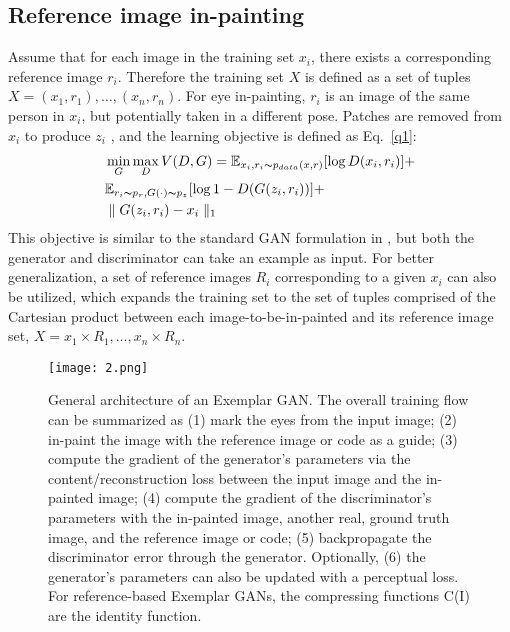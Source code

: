 \documentclass[10pt,twocolumn,letterpaper]{article}
\begin{document}
\subsection{Reference image in-painting}

Assume that for each image in the training set $x_i$, there exists a corresponding reference image $r_i$. Therefore the training set $X$ is defined as a set of tuples $X = {(x_1,r_1 ),\ldots,(x_n,r_n)}$. For eye in-painting, $r_i$ is an image of the same person in $x_i$, but potentially taken in a different pose. Patches are removed from $x_i$ to produce $z_i$ , and the learning objective is defined as Eq.~\ref{q1}:
\begin{equation}
\begin{aligned}
\begin{split}
&\min_G \max_D V(D,G)=\mathbb{E}_{x_i,r_i\thicksim p_{data}(x,r)} [\log D(x_i,r_i) ]+\\
&\mathbb{E}_{r_i\thicksim p_r,G(\cdot)\thicksim p_z} [\log 1 -D(G(z_i,r_i)) ]+\\
&\parallel G(z_i,r_i)-x_i \parallel_1 \label{q1}
\end{split}
\end{aligned}
\end{equation}
This objective is similar to the standard GAN formulation in \cite{Goodfellow2014Generative}, but both the generator and discriminator can take an example as input. For better generalization, a set of reference images $R_i$ corresponding to a given $x_i$ can also be utilized, which expands the training set to the set of tuples comprised of the Cartesian product between each image-to-be-in-painted and its reference image set, $X = {x_1\times R_1,\ldots, x_n\times R_n }$.

\begin{figure}
	\begin{center}
		\texttt{[image: 2.png]}
	\end{center}
	\caption{General architecture of an Exemplar GAN. The overall training flow can be summarized as (1) mark the eyes from the input image; (2) in-paint the image with the reference image or code as a guide; (3) compute the gradient of the generator's parameters via the content/reconstruction loss between the input image and the in-painted image; (4) compute the gradient of the discriminator’s parameters with the in-painted image, another real, ground truth image, and	the reference image or code; (5) backpropagate the discriminator error through the generator. Optionally, (6) the generator's parameters can also be updated with a perceptual loss. For reference-based Exemplar GANs, the compressing functions C(I) are the identity function.}
	\label{p2}
\end{figure}
\end{document}
